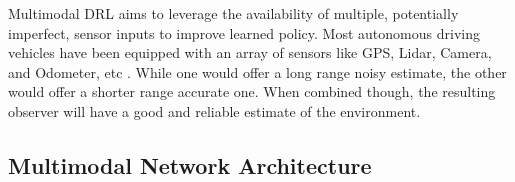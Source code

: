 \documentclass[../thesis.tex]{subfiles}
\begin{document}
Multimodal DRL aims to leverage the availability of multiple, potentially imperfect, sensor inputs to improve learned policy. 
Most autonomous driving vehicles have been equipped with an array of sensors like GPS, Lidar, Camera, and Odometer, etc \cite{hudda2013self}.
While one would offer a long range noisy estimate, the other would offer a shorter range accurate one. When combined though, the resulting observer will have a good and reliable estimate of the environment. 

\subsection{Multimodal Network Architecture}

\end{document}
